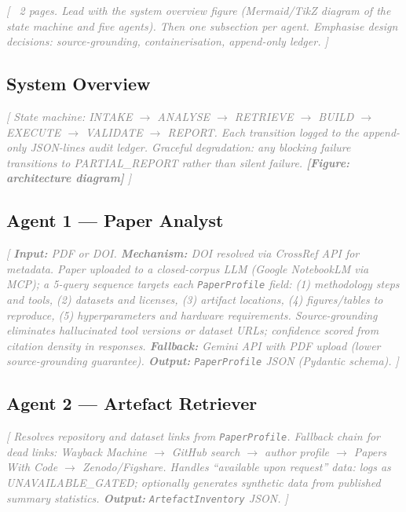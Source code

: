 \documentclass{article}
\newcommand{\outline}[1]{\textcolor{gray}{\textit{[#1]}}}
\begin{document}
\outline{%
  ~2 pages. Lead with the system overview figure (Mermaid/TikZ diagram
  of the state machine and five agents). Then one subsection per agent.
  Emphasise design decisions: source-grounding, containerisation,
  append-only ledger.
}

\subsection{System Overview}
\label{sec:overview}

\outline{%
  State machine: INTAKE $\to$ ANALYSE $\to$ RETRIEVE $\to$ BUILD
  $\to$ EXECUTE $\to$ VALIDATE $\to$ REPORT.
  Each transition logged to the append-only JSON-lines audit ledger.
  Graceful degradation: any blocking failure transitions to
  PARTIAL\_REPORT rather than silent failure.
  \textbf{[Figure: architecture diagram]}
}

\subsection{Agent 1 — Paper Analyst}
\label{sec:analyst}

\outline{%
  \textbf{Input:} PDF or DOI.
  \textbf{Mechanism:} DOI resolved via CrossRef API for metadata.
  Paper uploaded to a closed-corpus LLM (Google NotebookLM via MCP);
  a 5-query sequence targets each \texttt{PaperProfile} field:
  (1) methodology steps and tools, (2) datasets and licenses,
  (3) artifact locations, (4) figures/tables to reproduce,
  (5) hyperparameters and hardware requirements.
  Source-grounding eliminates hallucinated tool versions or dataset URLs;
  confidence scored from citation density in responses.
  \textbf{Fallback:} Gemini API with PDF upload (lower source-grounding guarantee).
  \textbf{Output:} \texttt{PaperProfile} JSON (Pydantic schema).
}

\subsection{Agent 2 — Artefact Retriever}
\label{sec:retriever}

\outline{%
  Resolves repository and dataset links from \texttt{PaperProfile}.
  Fallback chain for dead links: Wayback Machine $\to$ GitHub search
  $\to$ author profile $\to$ Papers With Code $\to$ Zenodo/Figshare.
  Handles ``available upon request'' data: logs as UNAVAILABLE\_GATED;
  optionally generates synthetic data from published summary statistics.
  \textbf{Output:} \texttt{ArtefactInventory} JSON.
}
\end{document}
